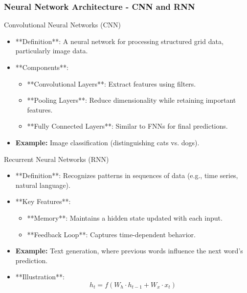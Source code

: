 \documentclass[aspectratio=169]{beamer}
\begin{document}
\begin{frame}[fragile]
    \frametitle{Neural Network Architecture - CNN and RNN}
    \begin{block}{Convolutional Neural Networks (CNN)}
        \begin{itemize}
            \item **Definition**: A neural network for processing structured grid data, particularly image data.
            \item **Components**:
                \begin{itemize}
                    \item **Convolutional Layers**: Extract features using filters.
                    \item **Pooling Layers**: Reduce dimensionality while retaining important features.
                    \item **Fully Connected Layers**: Similar to FNNs for final predictions.
                \end{itemize}
            \item \textbf{Example:} Image classification (distinguishing cats vs. dogs).
        \end{itemize}
    \end{block}

    \begin{block}{Recurrent Neural Networks (RNN)}
        \begin{itemize}
            \item **Definition**: Recognizes patterns in sequences of data (e.g., time series, natural language).
            \item **Key Features**:
                \begin{itemize}
                    \item **Memory**: Maintains a hidden state updated with each input.
                    \item **Feedback Loop**: Captures time-dependent behavior.
                \end{itemize}
            \item \textbf{Example:} Text generation, where previous words influence the next word's prediction.
            
            \item **Illustration**:
            \[
            h_t = f(W_h \cdot h_{t-1} + W_x \cdot x_t)
            \]
        \end{itemize}
    \end{block}
\end{frame}
\end{document}
